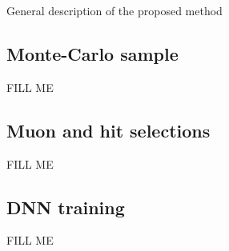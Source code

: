 General description of the proposed method

\subsection{Monte-Carlo sample}\label{sample}

FILL ME

\subsection{Muon and hit selections}\label{selection}

FILL ME

\subsection{DNN training}\label{training}

FILL ME
